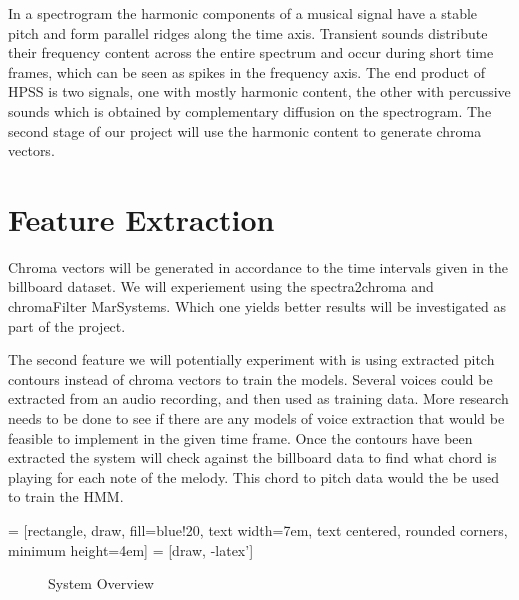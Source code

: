 \documentclass{article}
\begin{document}
In a spectrogram the harmonic components of a musical signal have a
stable pitch and form parallel ridges along the time axis. Transient sounds
distribute their frequency content across the entire spectrum and occur during
short time frames, which can be seen as spikes in the frequency axis. The end
product of HPSS is two signals, one with mostly harmonic content, the other
with percussive sounds which is obtained by complementary diffusion on the
spectrogram. The second stage of our project will use the harmonic content to
generate chroma vectors.

\section{Feature Extraction}

Chroma vectors will be generated in accordance to the time intervals given in
the billboard dataset.  We will experiement using the spectra2chroma and chromaFilter
MarSystems. Which one yields better results will be investigated as part of the
project.

The second feature we will potentially experiment with is using extracted
pitch contours instead of chroma vectors to train the models. Several voices could
be extracted from an audio recording, and then used as training data. More research needs
to be done to see if there are any models of voice extraction that would be feasible to
implement in the given time frame. Once the contours have been extracted the system will
check against the billboard data to find what chord is playing for each note of the melody.
This chord to pitch data would the be used to train the HMM.

 = [rectangle, draw, fill=blue!20,
    text width=7em, text centered, rounded corners, minimum height=4em]
 = [draw, -latex']

\begin{figure}
\caption{System Overview}
\end{figure}
\end{document}
